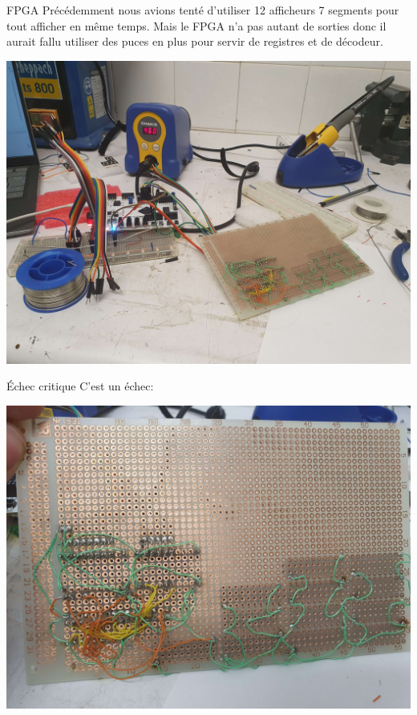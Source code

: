 \documentclass{beamer}
\begin{document}
\begin{frame}{FPGA}
  Précédemment nous avions tenté d'utiliser 12 afficheurs 7 segments
  pour tout afficher en même temps. Mais le FPGA n'a pas autant de
  sorties donc il aurait fallu utiliser des puces en plus pour servir
  de registres et de décodeur.
  \begin{center}
    \includegraphics[scale=0.05]{pictures/Soudure global.jpg}
  \end{center}
\end{frame}

\begin{frame}{Échec critique}
  C'est un échec:
  \begin{center}
    \includegraphics[scale=0.07]{pictures/Soudure proche.jpg}
  \end{center}
\end{frame}
\end{document}

